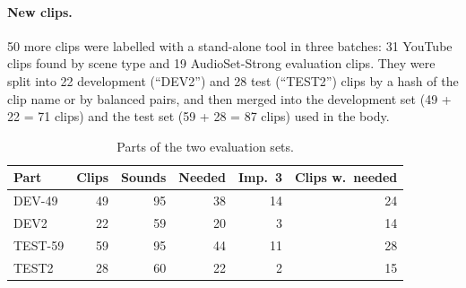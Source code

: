 \paragraph{New clips.} 50 more clips were labelled with a stand-alone tool in three
batches: 31 YouTube clips found by scene type and 19 AudioSet-Strong evaluation clips. They were split into 22
development (``DEV2'') and 28 test (``TEST2'') clips by a hash of the clip name or by balanced pairs, and then merged
into the development set (49 + 22 = 71 clips) and the test set (59 + 28 = 87 clips) used in the body.

\begin{table}[htbp]
\centering\small
\caption{Parts of the two evaluation sets.}
\begin{tabular}{lrrrrr}
\toprule
Part & Clips & Sounds & Needed & Imp.~3 & Clips w.\ needed \\
\midrule
DEV-49 & 49 & 95 & 38 & 14 & 24 \\
DEV2 & 22 & 59 & 20 & 3 & 14 \\
TEST-59 & 59 & 95 & 44 & 11 & 28 \\
TEST2 & 28 & 60 & 22 & 2 & 15 \\
\bottomrule
\end{tabular}
\end{table}

